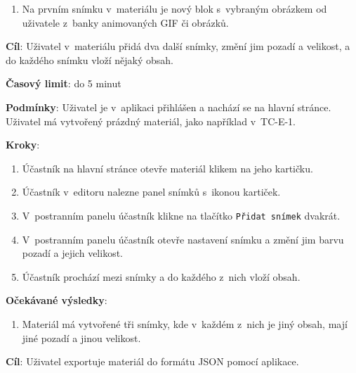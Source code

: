 \begin{enumerate}[leftmargin=1.4cm]
    \item Na prvním snímku v~materiálu je nový blok s~vybraným obrázkem od uživatele z~banky animovaných GIF či obrázků.
\end{enumerate}






\vspace{1em}

\textbf{Cíl}: Uživatel v~materiálu přidá dva další snímky, změní jim pozadí a velikost, a do každého snímku vloží nějaký obsah.

\textbf{Časový limit}: do 5 minut

\textbf{Podmínky}:  Uživatel je v~aplikaci přihlášen a nachází se na hlavní stránce. Uživatel má vytvořený prázdný materiál, jako například v~TC-E-1.

\textbf{Kroky}:

\begin{enumerate}[leftmargin=1.4cm]
    \item Účastník na hlavní stránce otevře materiál klikem na jeho kartičku.
    \item Účastník v~editoru nalezne panel snímků s~ikonou kartiček.
    \item V~postranním panelu účastník klikne na tlačítko \verb|Přidat snímek| dvakrát.
    \item V~postranním panelu účastník otevře nastavení snímku a změní jim barvu pozadí a jejich velikost.
    \item Účastník prochází mezi snímky a do každého z~nich vloží obsah.
\end{enumerate}

\textbf{Očekávané výsledky}:

\begin{enumerate}[leftmargin=1.4cm]
    \item Materiál má vytvořené tři snímky, kde v~každém z~nich je jiný obsah, mají jiné pozadí a jinou velikost.
\end{enumerate}






\vspace{1em}

\textbf{Cíl}: Uživatel exportuje materiál do formátu JSON pomocí aplikace.

